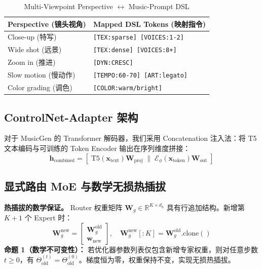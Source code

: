 \documentclass[10pt, conference, letterpaper]{IEEEtran}
\begin{document}
\begin{table}[htbp] %
\centering
\caption{Multi-Viewpoint Perspective $\leftrightarrow$ Music-Prompt DSL}
\label{tab:mapping}
\begin{tabular}{@{}ll@{}}
\toprule
\textbf{Perspective (镜头视角)} & \textbf{Mapped DSL Tokens (映射指令)} \\
\midrule
Close-up (特写) & \texttt{[TEX:sparse] [VOICES:1-2]} \\
Wide shot (远景) & \texttt{[TEX:dense] [VOICES:8+]} \\
Zoom in (推进) & \texttt{[DYN:CRESC]} \\
Slow motion (慢动作) & \texttt{[TEMPO:60-70] [ART:legato]} \\
Color grading (调色) & \texttt{[COLOR:warm/bright]} \\
\bottomrule
\end{tabular}
\end{table}

\subsection{ControlNet-Adapter 架构}
对于 MusicGen 的 Transformer 解码器，我们采用 Concatenation 注入法：将 T5 文本编码与可训练的 Token Encoder 输出在序列维度拼接：
\begin{equation}
\mathbf{h}_{\text{combined}} = [\;\text{T5}(\mathbf{x}_{\text{text}})\mathbf{W}_{\text{proj}}\;\|\;
\mathcal{E}_{\phi}(\mathbf{x}_{\text{token}})\mathbf{W}_{\text{out}}\;]
\end{equation}

\subsection{显式路由 MoE 与数学无损热插拔}
\textbf{热插拔的数学保证。} Router 权重矩阵 $\mathbf{W}_g \in \mathbb{R}^{K \times d_h}$ 具有行追加结构。新增第 $K+1$ 个 Expert 时：
\begin{equation}
\mathbf{W}_g^{\text{new}} = \begin{bmatrix}
\mathbf{W}_g^{\text{old}} \\ \hline \mathbf{w}_{\text{new}}
\end{bmatrix},\quad
\mathbf{W}_g^{\text{new}}[:K] = \mathbf{W}_g^{\text{old}}.\text{clone}()
\label{eq:hotplug}
\end{equation}
\textbf{命题 1（数学不可变性）：} 若优化器参数列表仅包含新增专家权重，则对任意步数 $t \geq 0$，有 $\Theta_{\text{old}}^{(t)} = \Theta_{\text{old}}^{(0)}$。梯度恒为零，权重保持不变，实现无损热插拔。
\end{document}
